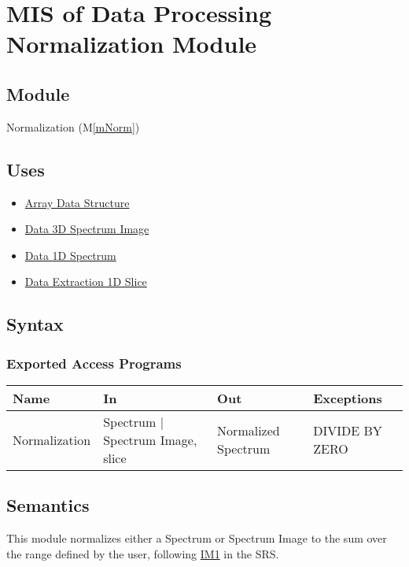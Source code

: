 \documentclass[12pt, titlepage]{article}
\newcommand{\mref}[1]{M\ref{#1}}
\begin{document}
\section{MIS of Data Processing Normalization Module} \label{Mod:Normalization}

\subsection{Module}
Normalization (\mref{mNorm})

\subsection{Uses}
\begin{itemize}
    \item \hyperref[Mod:Array]{Array Data Structure}
    \item \hyperref[Mod:SI]{Data 3D Spectrum Image}
    \item \hyperref[Mod:Spectrum]{Data 1D Spectrum}
    \item \hyperref[Mod:Slice1D]{Data Extraction 1D Slice}
\end{itemize}

\subsection{Syntax}

\subsubsection{Exported Access Programs}

\begin{center}
    \begin{tabular}{p{3cm} p{4cm} p{4cm} p{2cm}}
        \hline
        \textbf{Name} & \textbf{In} & \textbf{Out} & \textbf{Exceptions} \\
        \hline
        Normalization & Spectrum $|$ Spectrum Image, slice & Normalized Spectrum &
        DIVIDE BY ZERO \\
        \hline
    \end{tabular}
\end{center}

\subsection{Semantics}
This module normalizes either a Spectrum or Spectrum Image to the sum over the
range defined by the user, following \hyperref[normalization]{IM1} in the SRS.
\end{document}
